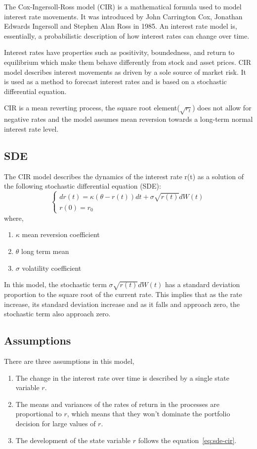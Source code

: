 The Cox-Ingersoll-Ross model (CIR) is a mathematical formula used
to model interest rate movements.
It was introduced by John Carrington Cox, Jonathan Edwards Ingersoll
and Stephen Alan Ross in 1985.
An interest rate model is, essentially, a probabilistic description of
how interest rates can change over time.

Interest rates have properties such as positivity, boundedness,
and return to equilibrium which make them behave differently from stock and
asset prices.
CIR model describes interest movements as driven by a sole source of market
risk.
It is used as a method to forecast interest rates and is based on a
stochastic differential equation.

CIR is a mean reverting process, the square root element($\sqrt{r_t}$) does
not allow for negative rates and the model assumes mean reversion towards a
long-term normal interest rate level.


\subsection{SDE}
The CIR model describes the dynamics of the interest rate r(t) as a
solution of the following stochastic differential equation (SDE):
\begin{equation}
	\begin{cases}
		d r(t)=\kappa(\theta-r(t)) d t+\sigma \sqrt{r(t)} d W(t) \\
		r(0)=r_{0}
	\end{cases}
	\label{eq:sde-cir}
\end{equation}
where,
\begin{enumerate}
	\item $\kappa$ mean reversion coefficient
	\item $\theta$ long term mean
	\item $\sigma$ volatility coefficient
\end{enumerate}
In this model, the stochastic term $\sigma \sqrt{r(t)} d W(t)$ has a
standard deviation proportion to the square root of the current rate.
This implies that as the rate increase, its standard deviation increase and
as it falls and approach zero, the stochastic term also approach zero.


\subsection{Assumptions}
There are three assumptions in this model,
\begin{enumerate}
	\item The change in the interest rate over time is described by a
	single state variable $r$.
	\item The means and variances of the rates of return in the
	processes are proportional to $r$, which means that they won’t
	dominate the portfolio decision for large values of $r$.
	\item The development of the state variable $r$ follows
	the equation~\ref{eq:sde-cir}.
\end{enumerate}


